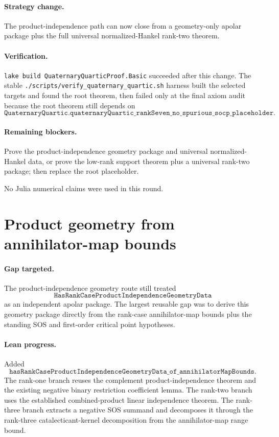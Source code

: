 \documentclass[11pt]{article}
\begin{document}
\paragraph{Strategy change.}
The product-independence path can now close from a geometry-only apolar package
plus the full universal normalized-Hankel rank-two theorem.

\paragraph{Verification.}
\texttt{lake build QuaternaryQuarticProof.Basic} succeeded after this change.
The stable \texttt{./scripts/verify\_quaternary\_quartic.sh} harness built the
selected targets and found the root theorem, then failed only at the final axiom
audit because the root theorem still depends on
\[
\texttt{QuaternaryQuartic.quaternaryQuartic\_rankSeven\_no\_spurious\_socp\_placeholder}.
\]

\paragraph{Remaining blockers.}
Prove the product-independence geometry package and universal normalized-Hankel
data, or prove the low-rank support theorem plus a universal rank-two package;
then replace the root placeholder.

No Julia numerical claims were used in this round.

\section*{Product geometry from annihilator-map bounds}

\paragraph{Gap targeted.}
The product-independence geometry route still treated
\[
\texttt{HasRankCaseProductIndependenceGeometryData}
\]
as an independent apolar package.  The largest reusable gap was to derive this
geometry package directly from the rank-case annihilator-map bounds plus the
standing SOS and first-order critical point hypotheses.

\paragraph{Lean progress.}
Added
\[
\texttt{hasRankCaseProductIndependenceGeometryData\_of\_annihilatorMapBounds}.
\]
The rank-one branch reuses the complement product-independence theorem and the
existing negative binary restriction coefficient lemma.  The rank-two branch
uses the established combined-product linear independence theorem.  The
rank-three branch extracts a negative SOS summand and decomposes it through the
rank-three catalecticant-kernel decomposition from the annihilator-map range
bound.
\end{document}
